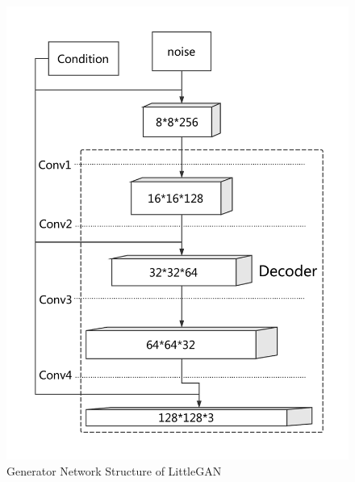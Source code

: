 \begin{figure}
    \begin{minipage}[t]{0.48\linewidth}
        \centering
        \includegraphics[width=\textwidth]{figures/net_generator.pdf}
        \caption{Generator Network Structure of LittleGAN}
        \label{net_generator}
    \end{minipage}
        \hfill
    \begin{minipage}[t]{0.48\linewidth}
        \centering

\end{minipage}
\end{figure}
